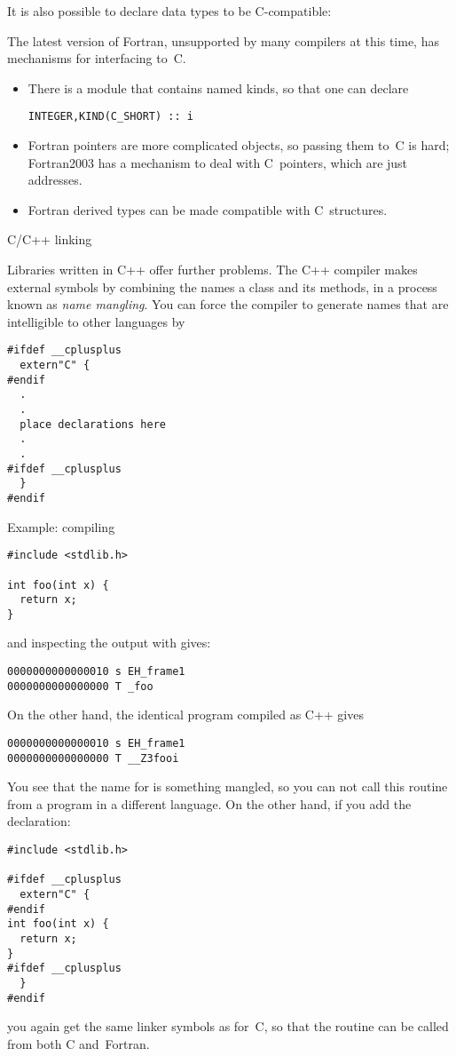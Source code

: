 It is also possible to declare data types to be C-compatible:


The latest version of Fortran, unsupported by many compilers at this
time, has mechanisms for interfacing to~C.
\begin{itemize}
\item There is a module that contains named kinds, so that one can declare
\begin{verbatim}
INTEGER,KIND(C_SHORT) :: i
\end{verbatim}
\item Fortran pointers are more complicated objects, so passing them
  to~C is hard; Fortran2003 has a mechanism to deal with C~pointers,
  which are just addresses.
\item Fortran derived types can be made compatible with C~structures.
\end{itemize}


 {C/C++ linking}

Libraries written in C++ offer further problems.
The C++ compiler makes external symbols by combining
the names a class and its methods, in a process known
as \emph{name mangling}.
You can force the compiler to
generate names that are intelligible to other languages by
\begin{verbatim}
#ifdef __cplusplus
  extern"C" {
#endif
  .
  .
  place declarations here
  .
  .
#ifdef __cplusplus
  }
#endif
\end{verbatim}

Example:
compiling
\begin{verbatim}
#include <stdlib.h>

int foo(int x) {
  return x;
}
\end{verbatim}
and inspecting the output with  gives:
\begin{verbatim}
0000000000000010 s EH_frame1
0000000000000000 T _foo
\end{verbatim}
On the other hand, the identical program compiled as C++ gives
\begin{verbatim}
0000000000000010 s EH_frame1
0000000000000000 T __Z3fooi
\end{verbatim}
You see that the name for  is something mangled, so you can not call 
this routine from a program in a different language. On the other hand,
if you add the  declaration:
\begin{verbatim}
#include <stdlib.h>

#ifdef __cplusplus
  extern"C" {
#endif
int foo(int x) {
  return x;
}
#ifdef __cplusplus
  }
#endif
\end{verbatim}
you again get the same linker symbols as for~C, so that the routine
can be called from both C and~Fortran.

